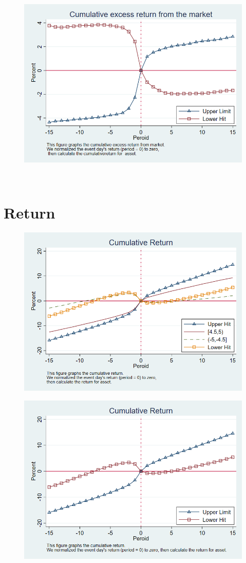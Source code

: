 \documentclass[12pt]{article}
\begin{document}
\begin{appendices}
\begin{figure}[htbp]
\centering
\includegraphics[width=0.7\linewidth]{ER}
\caption{}
\label{fig:er}
\end{figure}

\FloatBarrier
\begin{table}[htbp]
\centering

{}
\end{table}



\FloatBarrier

‌ %
‌ %
\section{Return}

\begin{figure}[htbp]
\centering
\includegraphics[width=0.7\linewidth]{TR}
\caption{}
\label{fig:tr}
\end{figure}


\begin{figure}[htbp]
\centering
\includegraphics[width=0.7\linewidth]{R}
\caption{}
\label{fig:r}
\end{figure}



\end{appendices}
\end{document}
